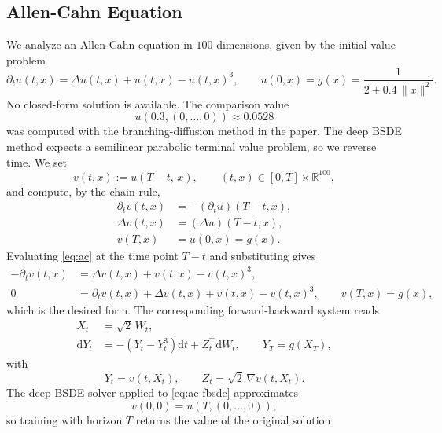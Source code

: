 ﻿\documentclass[10pt,a4paper]{article}
\begin{document}
\subsection{Allen-Cahn Equation}
\label{sec:ac}
We analyze an Allen-Cahn equation in $100$ dimensions, given by the initial value problem
\begin{equation}
\partial_t u(t,x) = \Delta u(t,x) + u(t,x) - u(t,x)^3,
\qquad
u(0,x) = g(x) = \frac{1}{2 + 0.4\,\lVert x\rVert^2}.
\label{eq:ac}
\end{equation}
No closed-form solution is available. The comparison value
\begin{equation}
u(0.3,(0,\dots,0)) \approx 0.0528
\end{equation}
was computed with the branching-diffusion method in the paper. The deep BSDE method expects a semilinear parabolic terminal value problem, so we reverse time. We set
\begin{equation}
v(t,x) := u(T-t,\,x), \qquad (t,x)\in[0,T]\times\mathbb R^{100},
\end{equation}
and compute, by the chain rule,
\begin{align}
\partial_t v(t,x) &= -\left(\partial_t u\right)(T-t,x),
\nonumber\\
\Delta v(t,x) &= (\Delta u)(T-t,x),
\nonumber\\
v(T,x) &= u(0,x) = g(x).
\end{align}
Evaluating \eqref{eq:ac} at the time point $T-t$ and substituting gives
\begin{align*}
-\partial_t v(t,x) &= \Delta v(t,x) + v(t,x) - v(t,x)^3,
\\
0 &= \partial_t v(t,x) + \Delta v(t,x) + v(t,x) - v(t,x)^3,
\qquad
v(T,x) = g(x),
\end{align*}
which is the desired form. The corresponding forward-backward system reads
\begin{align}
X_t &= \sqrt2\,W_t, \nonumber\\
\mathrm dY_t &= -\left(Y_t - Y_t^3\right)\mathrm dt
+ Z_t^{\top}\mathrm dW_t,
\qquad Y_T = g(X_T),
\label{eq:ac-fbsde}
\end{align}
with
\begin{equation}
Y_t = v(t,X_t),
\qquad
Z_t = \sqrt2\,\nabla v(t,X_t).
\end{equation}
The deep BSDE solver applied to \eqref{eq:ac-fbsde} approximates
\begin{equation}
v(0,0) = u(T,(0,\dots,0)),
\end{equation}
so training with horizon $T$ returns the value of the original solution
\end{document}
